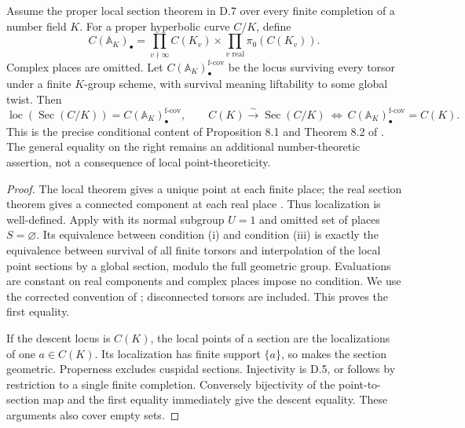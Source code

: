 Assume the proper local section theorem in D.7 over every finite completion
of a number field $K$.  For a proper hyperbolic curve $C/K$, define
\[
 C(\mathbb A_K)_\bullet=
 \prod_{v\nmid\infty} C(K_v)\times
 \prod_{v\text{ real}}\pi_0(C(K_v)).
\]
Complex places are omitted.  Let $C(\mathbb A_K)_\bullet^{\mathrm{f\text{-}cov}}$
be the locus surviving every torsor under a finite $K$-group scheme, with
survival meaning liftability to some global twist.  Then
\[
 \operatorname{loc}(\operatorname{Sec}(C/K))
   = C(\mathbb A_K)_\bullet^{\mathrm{f\text{-}cov}},
 \qquad
 C(K)\xrightarrow{\sim}\operatorname{Sec}(C/K)
 \ \Longleftrightarrow\
 C(\mathbb A_K)_\bullet^{\mathrm{f\text{-}cov}}=C(K).
 \tag{D.9.1}
\]
This is the precise conditional content of Proposition 8.1 and Theorem 8.2
of \citet{OpenAI019}.  The general equality on the right remains an additional
number-theoretic assertion, not a consequence of local point-theoreticity.
\begin{proof}
The local theorem gives a unique point at each finite place; the real section
theorem gives a connected component at each real place
\citep[Introduction, Theorem]{BrescianiVistoli2020}.  Thus localization is
well-defined.  Apply \citet[Theorem 2.1 and Remark 2.2(1), preprint
numbering]{HarariStix2012} with its normal subgroup $U=1$ and omitted set of
places $S=\varnothing$.  Its equivalence between condition (i) and condition
(iii) is exactly the equivalence between survival of all finite torsors and
interpolation of the local point sections by a global section, modulo the
full geometric group.  Evaluations are constant on real components and
complex places impose no condition.  We use the corrected convention of
\citet[Section 1]{Stoll2017Errata}; disconnected torsors are included.
This proves the first equality.

If the descent locus is $C(K)$, the local points of a section are the
localizations of one $a\in C(K)$.  Its localization has finite support
$\{a\}$, so \citet[Corollary 5]{Stix2015} makes the section geometric.
Properness excludes cuspidal sections.  Injectivity is D.5, or follows by
restriction to a single finite completion.  Conversely bijectivity of the
point-to-section map and the first equality immediately give the descent
equality.  These arguments also cover empty sets.
\end{proof}

